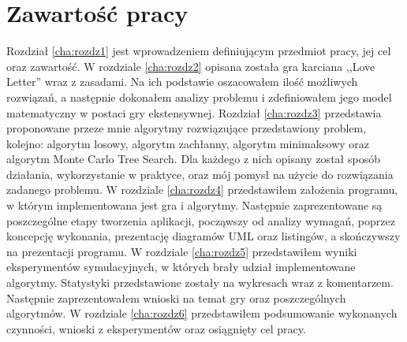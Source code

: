 \section{Zawartość pracy}
\label{sec:zawartoscPracy}
Rozdział \ref{cha:rozdz1} jest wprowadzeniem definiującym przedmiot pracy, jej cel oraz zawartość. W rozdziale \ref{cha:rozdz2} opisana została gra karciana ,,Love Letter'' wraz z zasadami. Na ich podstawie oszacowałem ilość możliwych rozwiązań, a następnie dokonałem analizy problemu i zdefiniowałem jego model matematyczny w postaci gry ekstensywnej. Rozdział \ref{cha:rozdz3} przedstawia proponowane przeze mnie algorytmy rozwiązujące przedstawiony problem, kolejno: algorytm losowy, algorytm zachłanny, algorytm minimaksowy oraz algorytm Monte Carlo Tree Search. Dla każdego z nich opisany został sposób działania, wykorzystanie w praktyce, oraz mój pomysł na użycie do rozwiązania zadanego problemu. W rozdziale \ref{cha:rozdz4} przedstawiłem założenia programu, w którym implementowana jest gra i algorytmy. Następnie zaprezentowane są poszczególne etapy tworzenia aplikacji, począwszy od analizy wymagań, poprzez koncepcję wykonania, prezentację diagramów UML oraz listingów, a skończywszy na prezentacji programu. W rozdziale \ref{cha:rozdz5} przedstawiłem wyniki eksperymentów symulacyjnych, w których brały udział implementowane algorytmy. Statystyki przedstawione zostały na wykresach wraz z komentarzem. Następnie zaprezentowałem wnioski na temat gry oraz poszczególnych algorytmów. W rozdziale \ref{cha:rozdz6} przedstawiłem podsumowanie wykonanych czynności, wnioski z eksperymentów oraz osiągnięty cel pracy.